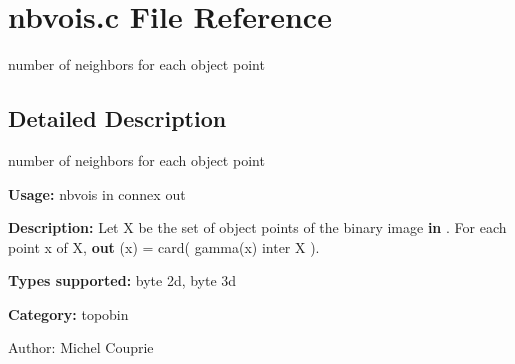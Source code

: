\section{nbvois.c File Reference}
\label{nbvois_8c}
number of neighbors for each object point 



\subsection{Detailed Description}
number of neighbors for each object point 

{\bf Usage:} nbvois in connex out

{\bf Description:} Let X be the set of object points of the binary image {\bf in} . For each point x of X, {\bf out} (x) = card( gamma(x) inter X ).

{\bf Types supported:} byte 2d, byte 3d

{\bf Category:} topobin

\begin{Desc}
\item[Author:]Michel Couprie \end{Desc}
